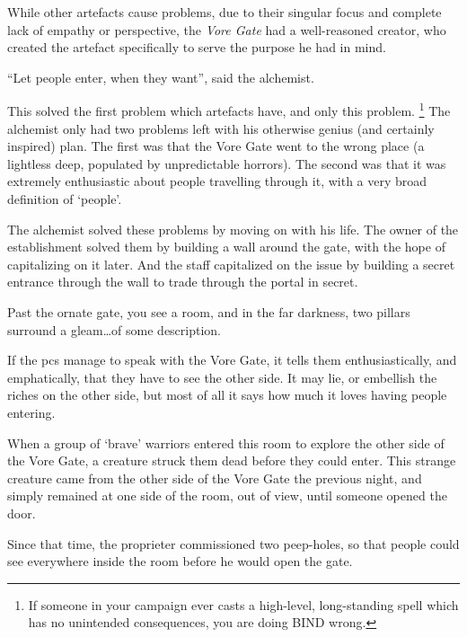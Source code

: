 \begin{exampletext}
  While other \glspl{artefact} cause problems, due to their singular focus and complete lack of empathy or perspective, the \textit{Vore Gate} had a well-reasoned creator, who created the \gls{artefact} specifically to serve the purpose he had in mind.

  ``Let people enter, when they want'', said the alchemist.

  This solved the first problem which \glspl{artefact} have, and only this problem.%
  \footnote{If someone in your campaign ever casts a high-level, long-standing spell which has no unintended consequences, you are doing BIND wrong.}
  The alchemist only had two problems left with his otherwise genius (and certainly inspired) plan.
  The first was that the Vore Gate went to the wrong place (a lightless \gls{deep}, populated by unpredictable horrors).
  The second was that it was extremely enthusiastic about people travelling through it, with a very broad definition of `people'.

  The alchemist solved these problems by moving on with his life.
  The owner of the establishment solved them by building a wall around the gate, with the hope of capitalizing on it later.
  And the staff capitalized on the issue by building a secret entrance through the wall to trade through the portal in secret.
\end{exampletext}

\begin{boxtext}
  Past the ornate gate, you see a room, and in the far darkness, two pillars surround a gleam\ldots of some description.
\end{boxtext}

If the \glspl{pc} manage to speak with the Vore Gate, it tells them enthusiastically, and emphatically, that they have to see the other side.
It may lie, or embellish the riches on the other side, but most of all it says how much it loves having people entering.

\noindent
\begin{exampletext}
  When a group of `brave' warriors entered this room to explore the other side of the Vore Gate, a creature struck them dead before they could enter.
  This strange creature came from the other side of the Vore Gate the previous night, and simply remained at one side of the room, out of view, until someone opened the door.

  Since that time, the proprieter commissioned two peep-holes, so that people could see everywhere inside the room before he would open the gate.
\end{exampletext}

